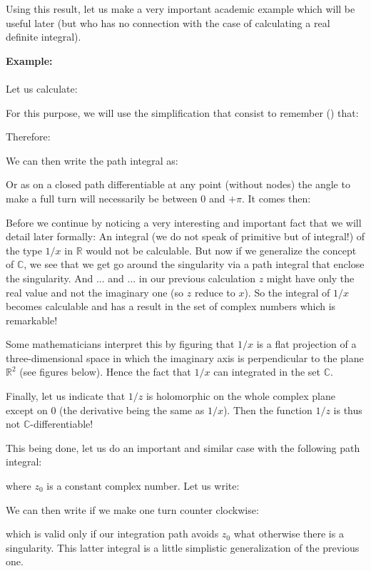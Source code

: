 	Using this result, let us make a very important academic example which will be useful later (but who has no connection with the case of calculating a real definite integral).
	\begin{tcolorbox}[colframe=black,colback=white,sharp corners]
	\textbf{{\Large {}}Example:}\\\\
	Let us calculate:
	
	For this purpose, we will use the simplification that consist to remember () that:
	
	Therefore:
	
	We can then write the path integral as:
	
	Or as on a closed path differentiable at any point (without nodes) the angle to make a full turn will necessarily be between $0$ and $+\pi$. It comes then:
	
	\end{tcolorbox}
	Before we continue by noticing a very interesting and important fact that we will detail later formally: An integral (we do not speak of primitive but of integral!) of the type $1/x$ in $\mathbb{R}$ would not be calculable. But now if we generalize the concept of $\mathbb{C}$, we see that we get go around the singularity via a path integral that enclose the singularity. And ... and ... in our previous calculation $z$ might have only the real value and not the imaginary one (so $z$ reduce to $x$). So the integral of $1/x$ becomes calculable and has a result in the set of complex numbers which is remarkable!
	
	Some mathematicians interpret this by figuring that $1/x$ is a flat projection of a three-dimensional space in which the imaginary axis is perpendicular to the plane $\mathbb{R}^2$ (see figures below). Hence the fact that $1/x$ can integrated in the set $\mathbb{C}$.
	
	Finally, let us indicate that $1/z$ is holomorphic on the whole complex plane except on $0$ (the derivative being the same as $1/x$). Then the function $1/z$ is thus not $\mathbb{C}$-differentiable!
	
	This being done, let us do an important and similar case with the following path integral:
	
	where $z_0$ is a constant complex number. Let us write:
	
	We can then write if we make one turn counter clockwise:
	
	which is valid only if our integration path avoids $z_0$ what otherwise there is a singularity. This latter integral is a little simplistic generalization of the previous one.
	

